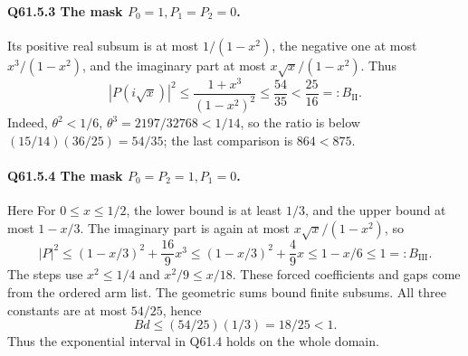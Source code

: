 \paragraph{Q61.5.3 The mask \(P_0=\allowbreak 1,\allowbreak P_1=\allowbreak P_2=\allowbreak 0\).}
Its positive real subsum is at most \(1/(1-x^2)\), the negative one
at most \(x^3/(1-x^2)\), and the imaginary part at most
\(x\sqrt x/(1-x^2)\). Thus
\begin{equation}\tag{Q61.5.4}\label{eq:Q61:5.4}
|P(i\sqrt x)|^2\le\frac{1+x^3}{(1-x^2)^2}
\le\frac{54}{35}<\frac{25}{16}=:B_{\mathrm {II}}.
\end{equation}
Indeed, \(\theta^2<\allowbreak 1/6\), \(\theta^3=\allowbreak 2197/32768<\allowbreak 1/14\), so the
ratio is below \((15/14)(36/25)=\allowbreak 54/35\); the last comparison is
\(864<\allowbreak 875\).

\paragraph{Q61.5.4 The mask \(P_0=\allowbreak P_2=\allowbreak 1,\allowbreak P_1=\allowbreak 0\).}
Here
For \(0\le\allowbreak  x\le\allowbreak 1/2\), the lower bound is at least \(1/3\), and the
upper bound at most \(1-x/3\). The imaginary part is again at most
\(x\sqrt x/(1-x^2)\), so
\begin{equation}\tag{Q61.5.5}\label{eq:Q61:5.5}
|P|^2\le(1-x/3)^2+\frac{16}{9}x^3
\le(1-x/3)^2+\frac49x\le1-x/6\le1=:B_{\mathrm {III}}.
\end{equation}
The steps use \(x^2\le\allowbreak 1/4\) and \(x^2/9\le\allowbreak  x/18\).
These forced coefficients and gaps come from the ordered arm list.
The geometric sums bound finite subsums. All three constants are
at most \(54/25\), hence
\begin{equation}\tag{Q61.5.6}\label{eq:Q61:5.6}
Bd\le(54/25)(1/3)=18/25<1.
\end{equation}
Thus the exponential interval in Q61.4 holds on the whole domain.

